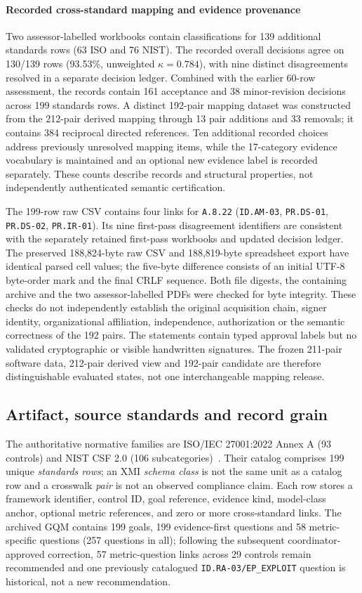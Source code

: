 \documentclass[12pt,a4paper]{article}
\begin{document}
\paragraph{Recorded cross-standard mapping and evidence provenance}
Two assessor-labelled workbooks contain classifications for 139 additional standards rows (63 ISO and 76 NIST). The recorded overall decisions agree on 130/139 rows (93.53\%, unweighted $\kappa=0.784$), with nine distinct disagreements resolved in a separate decision ledger. Combined with the earlier 60-row assessment, the records contain 161 acceptance and 38 minor-revision decisions across 199 standards rows. A distinct 192-pair mapping dataset was constructed from the 212-pair derived mapping through 13 pair additions and 33 removals; it contains 384 reciprocal directed references. Ten additional recorded choices address previously unresolved mapping items, while the 17-category evidence vocabulary is maintained and an optional new evidence label is recorded separately. These counts describe records and structural properties, not independently authenticated semantic certification.

The 199-row raw CSV contains four links for \texttt{A.8.22} (\texttt{ID.AM-03}, \texttt{PR.DS-01}, \texttt{PR.DS-02}, \texttt{PR.IR-01}). Its nine first-pass disagreement identifiers are consistent with the separately retained first-pass workbooks and updated decision ledger. The preserved 188,824-byte raw CSV and 188,819-byte spreadsheet export have identical parsed cell values; the five-byte difference consists of an initial UTF-8 byte-order mark and the final CRLF sequence. Both file digests, the containing archive and the two assessor-labelled PDFs were checked for byte integrity. These checks do not independently establish the original acquisition chain, signer identity, organizational affiliation, independence, authorization or the semantic correctness of the 192 pairs. The statements contain typed approval labels but no validated cryptographic or visible handwritten signatures. The frozen 211-pair software data, 212-pair derived view and 192-pair candidate are therefore distinguishable evaluated states, not one interchangeable mapping release.

\subsection{Artifact, source standards and record grain}
The authoritative normative families are ISO/IEC 27001:2022 Annex A (93 controls) and NIST CSF 2.0 (106 subcategories)~\cite{ISO27001_2022,NIST_CSF_2_0}. Their catalog comprises 199 unique \emph{standards rows}; an XMI \emph{schema class} is not the same unit as a catalog row and a crosswalk \emph{pair} is not an observed compliance claim. Each row stores a framework identifier, control ID, goal reference, evidence kind, model-class anchor, optional metric references, and zero or more cross-standard links. The archived GQM contains 199 goals, 199 evidence-first questions and 58 metric-specific questions (257 questions in all); following the subsequent coordinator-approved correction, 57 metric-question links across 29 controls remain recommended and one previously catalogued \texttt{ID.RA-03/EP\_EXPLOIT} question is historical, not a new recommendation.
\end{document}
